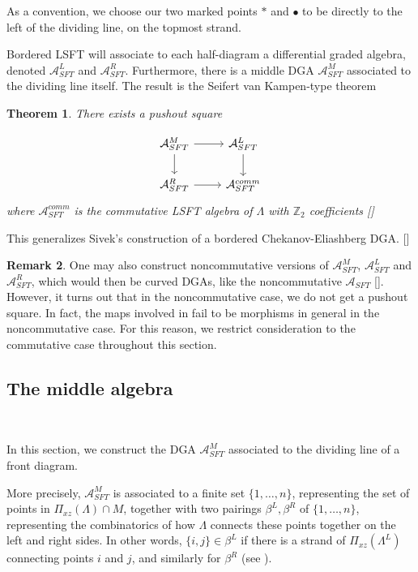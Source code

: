 \documentclass[a4paper,final, reqno]{amsart}
\theoremstyle{plain}
\newtheorem{Th}{Theorem}[section]
\theoremstyle{definition}
\newtheorem{Rem}[Th]{Remark}
\newcommand{\A}{\mathcal{A}}
\begin{document}
	As a convention, we choose our two marked points $*$ and $\bullet$ to be directly to the left of the dividing line, on the topmost strand. 
	
	Bordered LSFT will associate to each half-diagram a differential graded algebra, denoted $\A^L_{SFT}$ and $\A^R_{SFT}$. Furthermore, there is a middle DGA $\A^M_{SFT}$ associated to the dividing line itself. The result is the Seifert van Kampen-type theorem 
	
	\begin{Th} \label{thm:main}
		There exists a pushout square
		
		\[\begin{tikzcd}
			\A^M_{SFT} \arrow[r] \arrow[d] & \A^L_{SFT} \arrow[d] \\
			\A^R_{SFT} \arrow[r]           & \A^{comm}_{SFT}
		\end{tikzcd} \]
		where $\A^{comm}_{SFT}$ is the commutative LSFT algebra of $\Lambda$ with $\mathbb{Z}_2$ coefficients []
	\end{Th}
	
	This generalizes Sivek's construction of a bordered Chekanov-Eliashberg DGA. []
	
	\begin{Rem}
		One may also construct noncommutative versions of $\A^M_{SFT}$, $\A^L_{SFT}$ and $\A^R_{SFT}$, which would then be curved DGAs, like the noncommutative $\A_{SFT}$ []. However, it turns out that in the noncommutative case, we do not get a pushout square. In fact, the maps involved in  fail to be morphisms in general in the noncommutative case. For this reason, we restrict consideration to the commutative case throughout this section.
	\end{Rem}
	
	\subsection{The middle algebra}\label{subsec:AM}
	
	\-\
	
	In this section, we construct the DGA $\A^M_{SFT}$ associated to the dividing line of a front diagram. 
	
	More precisely, $\A^M_{SFT}$ is associated to a finite set $\{1,\dots, n\}$, representing the set of points in $\Pi_{xz}(\Lambda) \cap M$, together with two pairings $\beta^L, \beta^R$ of $\{1, \dots, n\}$, representing the combinatorics of how $\Lambda$ connects these points together on the left and right sides. In other words, $\{i,j\} \in \beta^L$ if there is a strand of $\Pi_{xz}(\Lambda^L)$ connecting points $i$ and $j$, and similarly for $\beta^R$ (see ).
	
\end{document}
